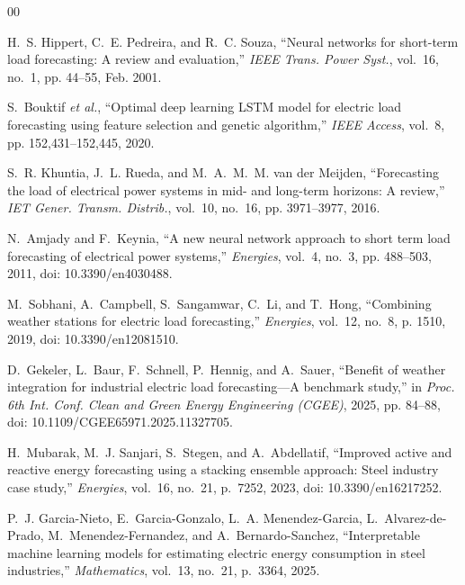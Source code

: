 \documentclass[conference]{IEEEtran}
\begin{document}
\begin{thebibliography}{00}

H.~S. Hippert, C.~E. Pedreira, and R.~C. Souza, ``Neural networks
for short-term load forecasting: A review and evaluation,''
\emph{IEEE Trans. Power Syst.}, vol.~16, no.~1, pp. 44--55,
Feb. 2001.

S.~Bouktif \emph{et al.}, ``Optimal deep learning LSTM model for
electric load forecasting using feature selection and genetic
algorithm,''
\emph{IEEE Access}, vol.~8, pp. 152,431--152,445, 2020.

S.~R. Khuntia, J.~L. Rueda, and M.~A.~M.~M. van der Meijden,
``Forecasting the load of electrical power systems in mid- and
long-term horizons: A review,''
\emph{IET Gener. Transm. Distrib.},
vol.~10, no.~16, pp. 3971--3977, 2016.

N.~Amjady and F.~Keynia, ``A new neural network approach to
short term load forecasting of electrical power systems,''
\emph{Energies}, vol.~4, no.~3, pp. 488--503, 2011,
doi: 10.3390/en4030488.

M.~Sobhani, A.~Campbell, S.~Sangamwar, C.~Li, and T.~Hong,
``Combining weather stations for electric load forecasting,''
\emph{Energies}, vol.~12, no.~8, p. 1510, 2019,
doi: 10.3390/en12081510.

D.~Gekeler, L.~Baur, F.~Schnell, P.~Hennig, and A.~Sauer,
``Benefit of weather integration for industrial electric load
forecasting---A benchmark study,'' in \emph{Proc. 6th Int.
Conf. Clean and Green Energy Engineering (CGEE)}, 2025,
pp. 84--88, doi: 10.1109/CGEE65971.2025.11327705.

H.~Mubarak, M.~J. Sanjari, S.~Stegen, and A.~Abdellatif,
``Improved active and reactive energy forecasting using a stacking
ensemble approach: Steel industry case study,''
\emph{Energies}, vol.~16, no.~21, p.~7252, 2023,
doi: 10.3390/en16217252.

P.~J. Garcia-Nieto, E.~Garcia-Gonzalo, L.~A. Menendez-Garcia,
L.~Alvarez-de-Prado, M.~Menendez-Fernandez, and A.~Bernardo-Sanchez,
``Interpretable machine learning models for estimating electric energy
consumption in steel industries,''
\emph{Mathematics}, vol.~13, no.~21, p.~3364, 2025.


\end{thebibliography}
\end{document}

